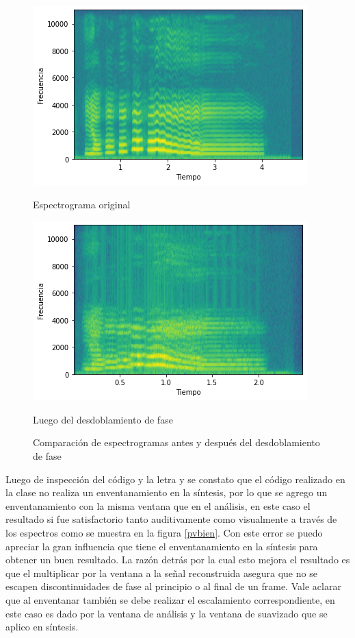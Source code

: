 \documentclass[a4paper]{article}
\begin{document}
\begin{figure}[!h]
\begin{minipage}[b]{0.5\linewidth}
\centering
\includegraphics[width=\linewidth]{original.png}
\caption{Espectrograma original}
\label{original}
\end{minipage}
\hspace{0.5cm}
\begin{minipage}[b]{0.5\linewidth}
\centering
\includegraphics[width=\linewidth]{pvmal.png}
\caption{Luego del desdoblamiento de fase}
\label{espect}
\end{minipage}
\caption{Comparación de espectrogramas antes y después del desdoblamiento de fase}
\label{pvmal}
\end{figure}

Luego de inspección del código y la letra y se constato que el código realizado en la clase no realiza un enventanamiento en la síntesis, por lo que se agrego un enventanamiento con la misma ventana que en el análisis, en este caso el resultado si fue satisfactorio tanto auditivamente como visualmente a través de los espectros como se muestra en la figura \ref{pvbien}. Con este error se puedo apreciar la gran influencia que tiene el enventanamiento en la síntesis para obtener un buen resultado. La razón detrás por la cual esto mejora el resultado es que el multiplicar por la ventana a la señal reconstruida asegura que no se escapen discontinuidades de fase al principio o al final de un frame. Vale aclarar que al enventanar también se debe realizar el escalamiento correspondiente, en este caso es dado por la ventana de análisis y la ventana de suavizado que se aplico en síntesis. 
\end{document}

